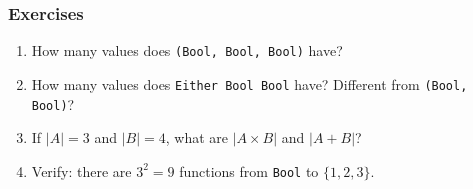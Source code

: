 \begin{goingdeeper}
\subsubsection*{Exercises}

\begin{enumerate}
  \item How many values does \texttt{(Bool, Bool, Bool)} have?
  \item How many values does \texttt{Either Bool Bool} have? Different from \texttt{(Bool, Bool)}?
  \item If $|A| = 3$ and $|B| = 4$, what are $|A \times B|$ and $|A + B|$?
  \item Verify: there are $3^2 = 9$ functions from \texttt{Bool} to $\{1, 2, 3\}$.
\end{enumerate}
\end{goingdeeper}

